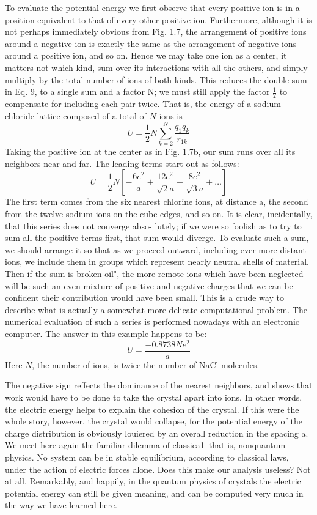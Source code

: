 To evaluate the potential energy we first observe that every positive
ion is in a position equivalent to that of every other positive ion.
Furthermore, although it is not perhaps immediately obvious from
Fig. 1.7, the arrangement of positive ions around a negative ion is
exactly the same as the arrangement of negative ions around a positive
ion, and so on. Hence we may take one ion as a center, it matters
not which kind, sum over its interactions with all the others, and
simply multiply by the total number of ions of both kinds. This
reduces the double sum in Eq. 9, to a single sum and a factor N; we
must still apply the factor $\frac{1}{2}$ to compensate for including each pair
twice. That is, the energy of a sodium chloride lattice composed of
a total of $N$ ions is
\begin{equation}
  U = \frac{1}{2} N \sum_{k=2}^N \frac{q_1q_k}{r_{1k}}
\end{equation}
Taking the positive ion at the center as in Fig. 1.7b, our sum runs
over all its neighbors near and far. The leading terms start out as
follows:
\begin{equation}
  U = \frac{1}{2} N \left[-\frac{6e^2}{a}+\frac{12e^2}{\sqrt{2}a}-\frac{8e^2}{\sqrt{3}a}+\ldots\right]
\end{equation}
The first term comes from the six nearest chlorine ions, at distance
a, the second from the twelve sodium ions on the cube edges, and so
on. It is clear, incidentally, that this series does not converge abso-
lutely; if we were so foolish as to try to sum all the positive terms
first, that sum would diverge. To evaluate such a sum, we should
arrange it so that as we proceed outward, including ever more distant
ions, we include them in groups which represent nearly neutral shells
of material. Then if the sum is broken oil", the more remote ions
which have been neglected will be such an even mixture of positive
and negative charges that we can be confident their contribution
would have been small. This is a crude way to describe what is
actually a somewhat more delicate computational problem. The
numerical evaluation of such a series is performed nowadays with an
electronic computer. The answer in this example happens to be:
\begin{equation}
  U = \frac{-0.8738Ne^2}{a}
\end{equation}
Here $N$, the number of ions, is twice the number of NaCl molecules.

The negative sign reffects the dominance of the nearest neighbors,
and shows that work would have to be done to take the crystal apart
into ions. In other words, the electric energy helps to explain the
cohesion of the crystal. If this were the whole story, however, the
crystal would collapse, for the potential energy of the charge distribution
is obviously louiered by an overall reduction in the spacing
a. We meet here again the familiar dilemma of classica1--that
is, nonquantum--physics. No system can be in stable equilibrium,
according to classical laws, under the action of electric forces alone.
Does this make our analysis useless? Not at all. Remarkably, and
happily, in the quantum physics of crystals the electric potential
energy can still be given meaning, and can be computed very much
in the way we have learned here.


